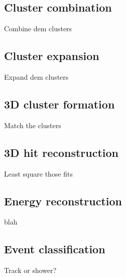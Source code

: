 \subsection{Cluster combination}
\label{subsec:ECalCombineClusters}
Combine dem clusters

\subsection{Cluster expansion}
\label{subsec:ECalExpandClusters}
Expand dem clusters

\subsection{3D cluster formation}
\label{subsec:ECal3DMatching}
Match the clusters

\subsection{3D hit reconstruction}
\label{subsec:ECal3DHitReconstruction}
Least square those fits

\subsection{Energy reconstruction}
\label{subsec:ECalEnergyReconstruction}
blah

\subsection{Event classification}
\label{subsec:ECalParticleIdentification}
Track or shower?
